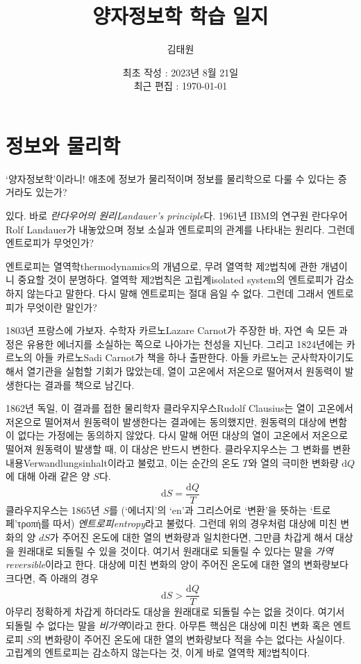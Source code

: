 \documentclass[a4paper,chapter,atbegshi]{oblivoir}
\title{양자정보학 학습 일지}
\author{김태원}
\date{최초 작성 : 2023년 8월 21일 \\ 최근 편집 : \today}
\begin{document}
\maketitle

\chapter{정보와 물리학}
`양자정보학'이라니! 애초에 정보가 물리적이며 정보를 물리학으로 다룰 수 있다는
증거라도 있는가? 

있다. 바로 \emph{란다우어의 원리\tiny Landauer's principle}다.
1961년 IBM의 연구원 란다우어{\tiny Rolf Landauer}가 내놓았으며 정보 소실과
엔트로피의 관계를 나타내는 원리다. 그런데 엔트로피가 무엇인가?

엔트로피는 열역학{\tiny thermodynamics}의 개념으로, 무려 열역학 제2법칙에
관한 개념이니 중요할 것이 분명하다. 열역학 제2법칙은 고립계{\tiny isolated
system}의 엔트로피가 감소하지 않는다고 말한다.
다시 말해 엔트로피는 절대 음일 수 없다. 그런데 그래서 엔트로피가 무엇이란 말인가? 

1803년 프랑스에 가보자. 수학자 카르노{\tiny Lazare Carnot}가 주장한 바, 자연
속 모든 과정은 유용한 에너지를 소실하는 쪽으로 나아가는 천성을 지닌다. 그리고 
1824년에는 카르노의 아들 카르노{\tiny Sadi Carnot}가 책을 하나 출판한다.
아들 카르노는 군사학자이기도 해서 열기관을 실험할 기회가 많았는데, 
열이 고온에서 저온으로 떨어져서 원동력이 발생한다는 결과를 책으로 남긴다.

1862년 독일, 이 결과를 접한 물리학자 클라우지우스{\tiny Rudolf Clausius}는 
열이 고온에서 저온으로 떨어져서 원동력이 발생한다는 결과에는 동의했지만, 
원동력의 대상에 변함이 없다는 가정에는 동의하지 않았다. 다시 말해 어떤
대상의 열이 고온에서 저온으로 떨어져 원동력이 발생할 때, 이 대상은 반드시
변한다. 클라우지우스는 그 변화를 변환내용{\tiny Verwandlungsinhalt}이라고
불렀고, 이는 순간의 온도 $T$와 열의 극미한 변화량 $\textrm{d}Q$에 대해 
아래 같은 양 $S$다.
\begin{equation}
  \textrm{d}S = \frac{\textrm{d}Q}{T}
\end{equation}
클라우지우스는 1865년 $S$를 (`에너지'의 `en'과 그리스어로 `변환'을 뜻하는
`트로페'{\tiny τροπή}를 따서) \emph{엔트로피\tiny entropy}라고 불렀다. 그런데
위의 경우처럼 대상에 미친 변화의 양 $dS$가 주어진 온도에 대한 열의 변화량과
일치한다면, 그만큼 차갑게 해서 대상을 원래대로 되돌릴 수 있을 것이다. 여기서
원래대로 되돌릴 수 있다는 말을 \emph{가역\tiny reversible}이라고 한다. 대상에
미친 변화의 양이 주어진 온도에 대한 열의 변화량보다 크다면, 즉 아래의 경우
\begin{equation}\label{eq:12}
  \textrm{d}S > \frac{\textrm{d}Q}{T}
\end{equation}
아무리 정확하게 차갑게 하더라도 대상을 원래대로 되돌릴 수는 없을 것이다. 여기서
되돌릴 수 없다는 말을 \emph{비가역}이라고 한다. 아무튼 핵심은 대상에 미친 변화
혹은 엔트로피 $S$의 변화량이 주어진 온도에 대한 열의 변화량보다 적을 수는 없다는
사실이다. 고립계의 엔트로피는 감소하지 않는다는 것, 이게 바로 열역학 제2법칙이다.
\end{document}
